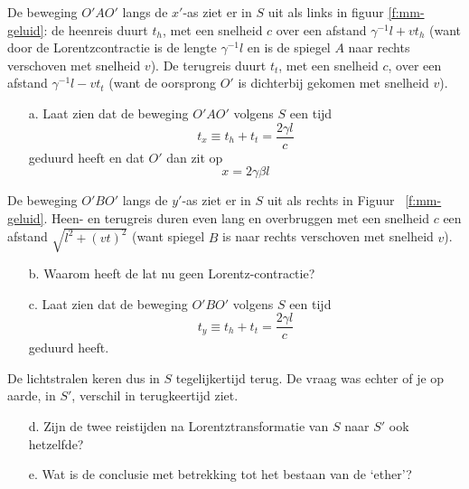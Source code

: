 De  beweging  $O'AO'$  langs  de  $x'$-as ziet er in $S$ uit als links in 
figuur \ref{f:mm-geluid}: 
de heenreis  duurt  $t_{h}$,  met  een  snelheid  $c$  over  een  afstand 
$\gamma ^{-1}l+vt_{h}$ (want door de 
Lorentzcontractie  is  de  lengte  $\gamma ^{-1}l$  en  is de
spiegel  $A$  naar rechts verschoven met snelheid $v$).
De terugreis  duurt  $t_{t}$,  met  een  snelheid $c$, over een afstand 
$\gamma ^{-1} l-vt_{t}$ (want de oorsprong $O'$ is 
dichterbij gekomen met snelheid $v$).

\begin{itemize}
\item [a.]
  Laat zien dat de beweging $O'AO'$ volgens $S$ een tijd 
\begin{displaymath}
  t_{x} \equiv t_{h} + t_{t} = \frac{2 \gamma l}{c}
\end{displaymath}
geduurd heeft en dat $O'$ dan zit op 
\begin{displaymath}
x = 2 \gamma \beta l
\end{displaymath}
\end{itemize}

De beweging $O'BO'$ langs de $y'$-as ziet er in $S$ uit als rechts in
Figuur ~\ref{f:mm-geluid}.
Heen-  en terugreis  duren  even lang en  overbruggen met 
een snelheid $c$ een afstand $\sqrt{l^{2} + (vt)^{2}}$
(want spiegel $B$ is naar rechts verschoven met snelheid $v$).

\begin{itemize}
\item [b.]
Waarom heeft de lat nu geen Lorentz-contractie?
\item [c.]
Laat zien dat de beweging $O'BO'$ volgens $S$ een tijd
\begin{displaymath}
t_{y} \equiv t_{h} + t_{t} = \frac{2 \gamma l}{c}
\end{displaymath}
geduurd heeft.
\end{itemize}
De  lichtstralen  keren  dus in $S$ tegelijkertijd terug.
De vraag was echter of je op aarde, in $S'$, verschil in terugkeertijd ziet.

\begin{itemize}
\item [d.]
Zijn de twee reistijden na 
Lorentztransformatie van $S$ naar $S'$ ook hetzelfde?
\item [e.]
Wat is de conclusie met betrekking tot het bestaan van de `ether'?
\end{itemize}

